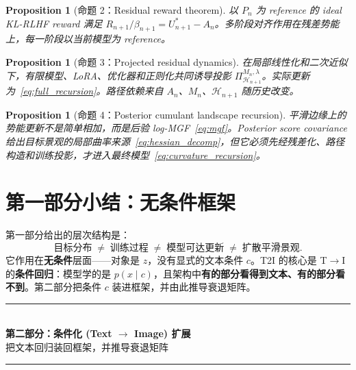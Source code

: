 \documentclass[11pt,a4paper]{article}
\newtheorem{proposition}[theorem]{Proposition}
\newcommand{\cH}{\mathcal{H}}
\newcommand{\ProjectOp}{\Pi}
\begin{document}
\begin{proposition}[命题 2：Residual reward theorem]
以 $P_n$ 为 reference 的 ideal KL-RLHF reward 满足 $R_{n+1}/\beta_{n+1} = U_{n+1}^* - A_n$。多阶段对齐作用在残差势能上，每一阶段以当前模型为 reference。
\end{proposition}

\begin{proposition}[命题 3：Projected residual dynamics]
在局部线性化和二次近似下，有限模型、LoRA、优化器和正则化共同诱导投影 $\ProjectOp_{\cH_{n+1}}^{M_n,\lambda}$。实际更新为~\eqref{eq:full_recursion}。路径依赖来自 $A_n$、$M_n$、$\cH_{n+1}$ 随历史改变。
\end{proposition}

\begin{proposition}[命题 4：Posterior cumulant landscape recursion]
平滑边缘上的势能更新不是简单相加，而是后验 log-MGF~\eqref{eq:mgf}。Posterior score covariance 给出目标景观的局部曲率来源~\eqref{eq:hessian_decomp}，但它必须先经残差化、路径构造和训练投影，才进入最终模型~\eqref{eq:curvature_recursion}。
\end{proposition}

\section{第一部分小结：无条件框架}
\label{sec:conclusion}

第一部分给出的层次结构是：
\[
\text{目标分布} \;\neq\; \text{训练过程} \;\neq\; \text{模型可达更新} \;\neq\; \text{扩散平滑景观}.
\]
它作用在\textbf{无条件}层面——对象是 $z$，没有显式的文本条件 $c$。T2I 的核心是 T$\to$I 的\textbf{条件回归}：模型学的是 $p(x\mid c)$，且架构中\textbf{有的部分看得到文本、有的部分看不到}。第二部分把条件 $c$ 装进框架，并由此推导衰退矩阵。

\bigskip
\noindent{}

\bigskip
\begin{center}
\rule{0.6\textwidth}{0.8pt}\\[4pt]
{\Large\textbf{第二部分：条件化 (Text $\to$ Image) 扩展}}\\[2pt]
{\normalsize 把文本回归装回框架，并推导衰退矩阵}\\[4pt]
\rule{0.6\textwidth}{0.8pt}
\end{center}
\end{document}
